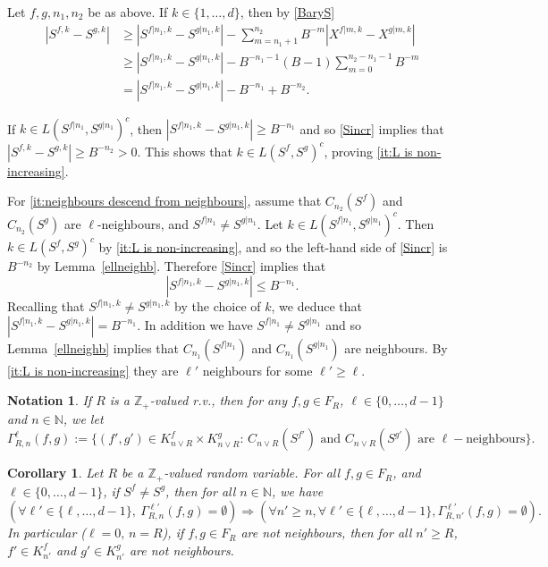 \documentclass[12pt]{article}
\makeatletter
\renewenvironment{proof}[1][\proofname]{%
\par\pushQED{\qed}\normalfont%
\topsep6\p@\@plus6\p@\relax
\trivlist\item[\hskip\labelsep\bfseries#1\@addpunct{.}]%
\ignorespaces
}{%
\popQED\endtrivlist\@endpefalse
}
\numberwithin{theorem}{section}
\newtheorem{corollary}[theorem]{Corollary}
\theoremstyle{def}
\newtheorem*{notation}{Notation}
\numberwithin{equation}{section}
\newcommand{\Z}{\mathbb{Z}}
\newcommand{\N}{\mathbb{N}}
\makeatother
\begin{document}
\begin{proof}Let $f,g,n_1,n_2$ be as above. If $k\in\{1,\dots,d\}$, then by \eqref{BaryS}
\begin{align}\label{Sincr}
\nonumber|S^{f,k}-S^{g,k}|&\ge |S^{f|n_1,k}-S^{g|n_1,k}|-\sum_{m=n_1+1}^{n_2}B^{-m}|X^{f|m,k}-X^{g|m,k}|\\
\nonumber&\ge |S^{f|n_1,k}-S^{g|n_1,k}|-B^{-n_1-1}(B-1)\sum_{m=0}^{n_2-n_1-1}B^{-m}\\
&= |S^{f|n_1,k}-S^{g|n_1,k}|-B^{-n_1}+B^{-n_2}.
\end{align}

If $k\in L(S^{f|n_1},S^{g|n_1})^c$, then $|S^{f|n_1,k}-S^{g|n_1,k}|\ge B^{-n_1}$ and so \eqref{Sincr} implies that \break
 $|S^{f,k}-S^{g,k}|\ge B^{-n_2}>0$. This shows that $k\in L(S^f,S^g)^c$, proving \ref{it:L is non-increasing}.

For \ref{it:neighbours descend from neighbours}, assume that $C_{n_2}(S^f)$ and $C_{n_2}(S^g)$ are $\ell$-neighbours, and $S^{f|n_1}\neq S^{g|n_1}$. 
Let $k\in L(S^{f|n_1},S^{g|n_1})^c$.  
Then $k\in L(S^f,S^g)^c$ by \ref{it:L is non-increasing}, and so the left-hand side of \eqref{Sincr} is $B^{-n_2}$ by Lemma~\ref{ellneighb}. 
Therefore \eqref{Sincr} implies that
\[|S^{f|n_1,k}-S^{g|n_1,k}|\le B^{-n_1}.\]
Recalling that $S^{f|n_1,k}\neq S^{g|n_1,k}$ by the choice of $k$, we deduce that $|S^{f|n_1,k}-S^{g|n_1,k}|=B^{-n_1}$. 
In addition we have $S^{f|n_1}\neq S^{g|n_1}$ and so Lemma~\ref{ellneighb} implies that $C_{n_1}(S^{f|n_1})$ and $C_{n_1}(S^{g|n_1})$ are neighbours. 
By \ref{it:L is non-increasing} they are $\ell'$ neighbours for some $\ell'\ge \ell$. 
\end{proof}

\begin{notation}  If $R$ is a $\Z_+$-valued r.v., then for any $f ,g\in F_R$, $\ell\in\{0,\dots,d-1\}$ and $n\in\N$, we let 
\[\Gamma_{R,n}^\ell(f,g):=\{(f',g')\in K_{n\vee R}^f\times K_{n\vee R}^g:\, C_{n\vee R}(S^{f'})\text{ and }C_{n\vee R}(S^{g'})\text{ are }\ell-\text{neighbours}\}.\]
\end{notation}

\begin{corollary}\label{gamma0} 
Let $R$ be a $\Z_+$-valued random variable. 
	For all  $f ,g\in F_R$, and $\ell\in\{0,\dots,d-1\}$, if $S^f\neq S^g$, then for all $n\in\N$, we have	
\[ \left(\forall \ell'\in\{\ell,\dots,d-1\}, \ \Gamma_{R,n}^{\ell'}(f,g)=\emptyset\right)  \Rightarrow \left(\forall n'\ge n, \forall \ell'\in\{\ell,\dots,d-1\}, \Gamma_{R,n'}^{\ell'}(f,g)=\emptyset\right).\]
In particular ($\ell=0,\, n=R$),  
if $f,g\in F_R$ are not neighbours, then 
for all $n'\ge R$, 
$f'\in K^f_{n'}$ and $g' \in K^g_{n'}$ are not neighbours.
\end{corollary}
\end{document}
